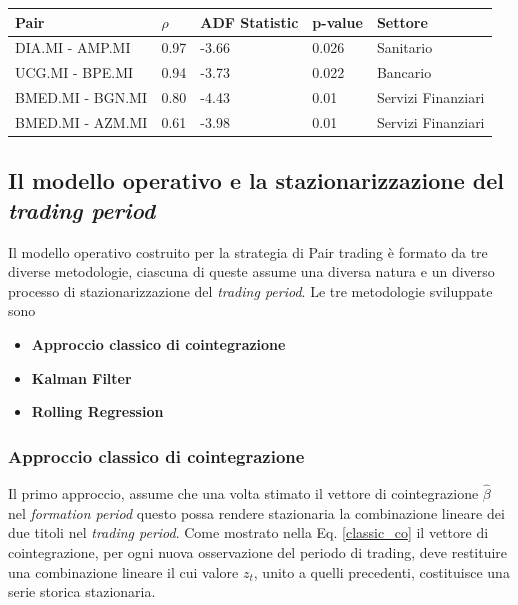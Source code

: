 \documentclass[]{article}
\begin{document}
\begin{center}
\label{selezione}
\begin{tabular}{ p{4cm}p{1cm}p{2cm}p{1cm}p{3cm} }
	\hline
	Pair & $\rho$ & ADF Statistic & p-value & Settore\\
	\hline
	DIA.MI - AMP.MI  & 0.97  & -3.66 &  0.026 & Sanitario\\
	UCG.MI - BPE.MI & 0.94 & -3.73 & 0.022 & Bancario\\
	BMED.MI - BGN.MI & 0.80 & -4.43 & 0.01 & Servizi Finanziari \\
	BMED.MI - AZM.MI  & 0.61 & -3.98 & 0.01 & Servizi Finanziari\\
	\hline
\end{tabular}
\end{center}


\subsection{Il modello operativo e la stazionarizzazione del \textit{trading period}}

Il modello operativo costruito per la strategia di Pair trading è formato da tre diverse metodologie, ciascuna di queste assume una diversa natura e un diverso processo di stazionarizzazione del \textit{trading period}.
Le tre metodologie sviluppate sono
\begin{itemize}
	\item \textbf{Approccio classico di cointegrazione}
	\item \textbf{Kalman Filter}
	\item \textbf{Rolling Regression}
\end{itemize}

\subsubsection*{Approccio classico di cointegrazione}

Il primo approccio, assume che una volta stimato il vettore di cointegrazione $\hat{\beta}$ nel \textit{formation period} questo possa rendere stazionaria la combinazione lineare dei due titoli nel \textit{trading period}. 
Come mostrato nella Eq. \ref{classic_co} il vettore di cointegrazione, per ogni nuova osservazione del periodo di trading, deve restituire una combinazione lineare il cui valore $z_t$, unito a quelli precedenti, costituisce una serie storica stazionaria.
\end{document}
